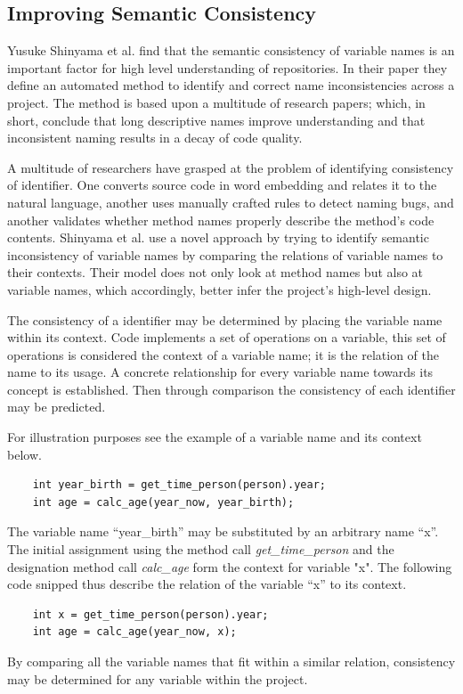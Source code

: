 \documentclass[a4paper,12pt]{article}
\begin{document}
\begin{multicols}{2}
    \section*{Improving Semantic Consistency}
    Yusuke Shinyama et al. find that the semantic consistency of variable names is an important factor for high level
    understanding of repositories.\cite{shinyama_improving_2021} In their paper they define an automated method to
    identify
    and correct name inconsistencies across a project. The method is based upon a multitude of research papers; which,
    in
    short, conclude that long descriptive names improve understanding and that inconsistent naming results in a decay
    of
    code quality.

    A multitude of researchers have grasped at the problem of identifying consistency of identifier. One converts
    source
    code in word embedding and relates it to the natural language, another uses manually crafted rules to detect naming
    bugs, and another validates whether method names properly describe the method’s code contents. Shinyama et al. use
    a
    novel approach by trying to identify semantic inconsistency of variable names by comparing the relations of
    variable
    names to their contexts. Their model does not only look at method names but also at variable names, which
    accordingly,
    better infer the project’s high-level design.

    The consistency of a identifier may be determined by placing the variable name within its context. Code implements
    a
    set of operations on a variable, this set of operations is considered the context of a variable name; it is the
    relation of the name to its usage. A concrete relationship for every variable name towards its concept is
    established. Then through comparison the consistency of each identifier may be predicted.

    For illustration purposes see the example of a variable name and its context below.
    \fontsize{7pt}{7pt}\selectfont
    \begin{verbatim}
    int year_birth = get_time_person(person).year;
    int age = calc_age(year_now, year_birth);
\end{verbatim}
    \fontsize{12pt}{12pt}\selectfont

    The variable name “year\_birth” may be substituted by an arbitrary name “x”. The initial assignment using the
    method
    call \textit{get\_time\_person} and the designation method call \textit{calc\_age} form the context for variable
    "x".
    The following code snipped thus describe the relation of the variable “x” to its context.
    \fontsize{7pt}{7pt}\selectfont
    \begin{verbatim}
    int x = get_time_person(person).year;
    int age = calc_age(year_now, x);
\end{verbatim}
    \fontsize{12pt}{12pt}\selectfont
    By comparing all the variable names that fit within a similar relation, consistency may be determined for any
    variable
    within the project.


\end{multicols}
\end{document}
